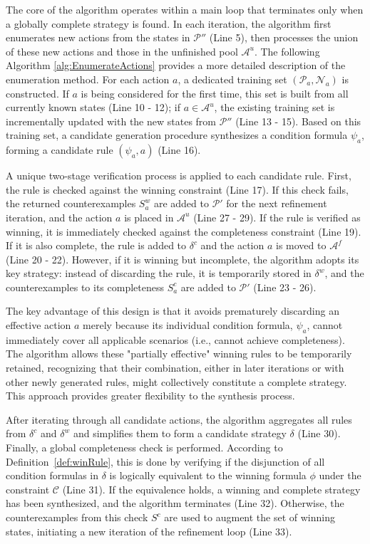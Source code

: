 \documentclass[review]{elsarticle}
\newcommand{\positiveSet}{\mathcal{P}}
\newcommand{\negativeSet}{\mathcal{N}}
\newcommand{\act}{\mathcal{A}}
\newcommand{\constraint}{\mathcal{C}}
\begin{document}
The core of the algorithm operates within a main loop that terminates only when a globally complete strategy is found. 
In each iteration, the algorithm first enumerates new actions from the states in $\positiveSet''$ (Line 5), 
then processes the union of these new actions and those in the unfinished pool $\act^u$. 
The following Algorithm \ref{alg:EnumerateActions} provides a more detailed description of the enumeration method. 
For each action $a$, a dedicated training set $(\positiveSet_a, \negativeSet_a)$ is constructed. 
If $a$ is being considered for the first time, this set is built from all currently known states (Line 10 - 12); 
if $a \in \act^u$, the existing training set is incrementally updated with the new states from $\positiveSet''$ (Line 13 - 15). 
Based on this training set, a candidate generation procedure synthesizes a condition formula $\psi_a$, forming a candidate rule $(\psi_a, a)$ (Line 16).

A unique two-stage verification process is applied to each candidate rule. 
First, the rule is checked against the winning constraint (Line 17). 
If this check fails, the returned counterexamples $S^w_a$ are added to $\positiveSet'$ for the next refinement iteration, and the action $a$ is placed in $\act^u$ (Line 27 - 29). 
If the rule is verified as winning, it is immediately checked against the completeness constraint (Line 19). 
If it is also complete, the rule is added to $\delta^c$ and the action $a$ is moved to $\act^f$ (Line 20 - 22). 
However, if it is winning but incomplete, the algorithm adopts its key strategy: 
instead of discarding the rule, it is temporarily stored in $\delta^w$, and the counterexamples to its completeness $S^c_a$ are added to $\positiveSet'$ (Line 23 - 26).

The key advantage of this design is that it avoids prematurely discarding an effective action $a$ merely because its individual condition formula, 
$\psi_a$, cannot immediately cover all applicable scenarios (i.e., cannot achieve completeness). 
The algorithm allows these "partially effective" winning rules to be temporarily retained, recognizing that their combination, either in later iterations or with other newly generated rules, might collectively constitute a complete strategy. 
This approach provides greater flexibility to the synthesis process.

After iterating through all candidate actions, the algorithm aggregates all rules from $\delta^c$ and $\delta^w$ and simplifies them to form a candidate strategy $\delta$ (Line 30). 
Finally, a global completeness check is performed. According to Definition~\ref{def:winRule}, this is done by verifying if the disjunction of all condition formulas in $\delta$ is logically equivalent to the winning formula $\phi$ under the constraint $\constraint$ (Line 31). 
If the equivalence holds, a winning and complete strategy has been synthesized, and the algorithm terminates (Line 32). 
Otherwise, the counterexamples from this check $S^c$ are used to augment the set of winning states, initiating a new iteration of the refinement loop (Line 33).
\end{document}
